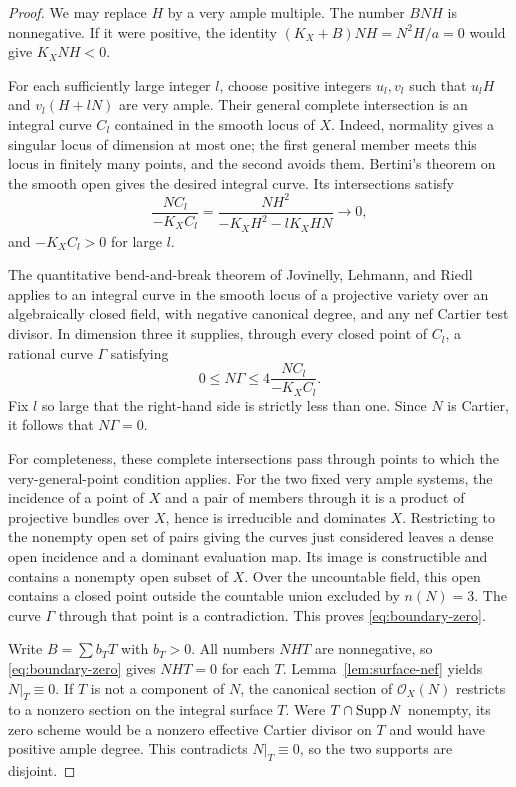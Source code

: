 \begin{proof}
We may replace $H$ by a very ample multiple. The number $BNH$ is
nonnegative. If it were positive, the identity
$(K_X+B)NH=N^2H/a=0$ would give $K_XNH<0$.

For each sufficiently large integer $l$, choose positive integers
$u_l,v_l$ such that $u_lH$ and $v_l(H+lN)$ are very ample. Their general
complete intersection is an integral curve $C_l$ contained in the
smooth locus of $X$. Indeed, normality gives a singular locus of
dimension at most one; the first general member meets this locus in
finitely many points, and the second avoids them. Bertini's theorem on
the smooth open gives the desired integral curve. Its intersections
satisfy
\begin{equation}\label{eq:bend-ratio}
\frac{NC_l}{-K_XC_l}
=\frac{NH^2}{-K_XH^2-lK_XHN}\longrightarrow0,
\end{equation}
and $-K_XC_l>0$ for large $l$.

The quantitative bend-and-break theorem of Jovinelly, Lehmann, and
Riedl \cite[Theorem~1.1]{JLR} applies to an integral curve in the smooth
locus of a projective variety over an algebraically closed field, with
negative canonical degree, and any nef Cartier test divisor. In
dimension three it supplies, through every closed point of $C_l$, a
rational curve $\Gamma$ satisfying
\[
0\leq N\Gamma\leq4\frac{NC_l}{-K_XC_l}.
\]
Fix $l$ so large that the right-hand side is strictly less than one.
Since $N$ is Cartier, it follows that $N\Gamma=0$.

For completeness, these complete intersections pass through points to
which the very-general-point condition applies. For the two fixed very
ample systems, the incidence of a point of $X$ and a pair of members
through it is a product of projective bundles over $X$, hence is
irreducible and dominates $X$. Restricting to the nonempty open set of
pairs giving the curves just considered leaves a dense open incidence
and a dominant evaluation map. Its image is constructible and contains
a nonempty open subset of $X$. Over the uncountable field, this open
contains a closed point outside the countable union excluded by
$n(N)=3$. The curve $\Gamma$ through that point is a contradiction.
This proves \eqref{eq:boundary-zero}.

Write $B=\sum b_TT$ with $b_T>0$. All numbers $NHT$ are nonnegative,
so \eqref{eq:boundary-zero} gives $NHT=0$ for each $T$.
Lemma~\ref{lem:surface-nef} yields $N|_T\equiv0$. If $T$ is not a
component of $N$, the canonical section of $\mathcal O_X(N)$ restricts
to a nonzero section on the integral surface $T$. Were $T\cap\operatorname{Supp} N$
nonempty, its zero scheme would be a nonzero effective Cartier divisor
on $T$ and would have positive ample degree. This contradicts
$N|_T\equiv0$, so the two supports are disjoint.
\end{proof}


